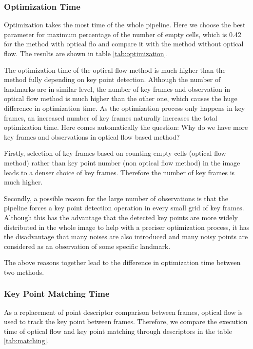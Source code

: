 \documentclass{easychair}
\begin{document}
\subsubsection{Optimization Time}
Optimization takes the most time of the whole pipeline. Here we choose the best parameter for maximum percentage of the number of empty cells, which is 0.42 for the method with optical flo and compare it with the method without optical flow. The results are shown in table \ref{tab:optimization}.

The optimization time of the optical flow method is much higher than the method fully depending on key point detection. Although the number of landmarks are in similar level, the number of key frames and observation in optical flow method is much higher than the other one, which causes the huge difference in optimization time. As the optimization process only happens in key frames, an increased number of key frames naturally increases the total optimization time. Here comes automatically the question: Why do we have more key frames and observations in optical flow based method?

Firstly, selection of key frames based on counting empty cells (optical flow method) rather than key point number (non optical flow method) in the image leads to a denser choice of key frames. Therefore the number of key frames is much higher.

Secondly, a possible reason for the large number of observations is that the pipeline forces a key point detection operation in every small grid of key frames. Although this has the advantage that the detected key points are more widely distributed in the whole image to help with a preciser optimization process, it has the disadvantage that many noises are also introduced and many noisy points are considered as an observation of some specific landmark.  

The above reasons together lead to the difference in optimization time between two methods.



\subsubsection{Key Point Matching Time}
As a replacement of point descriptor comparison between frames, optical flow is used to track the key point between frames. Therefore, we compare the execution time of optical flow and key point matching through descriptors in the table \ref{tab:matching}.
\end{document}
